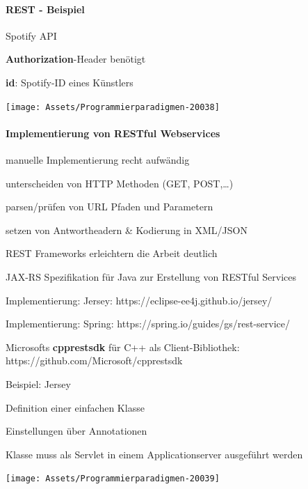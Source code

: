 \documentclass[10pt]{article}
\begin{document}
  \paragraph{REST - Beispiel}
  
  Spotify API
  \begin{itemize*}
    \item \textbf{Authorization}-Header benötigt
    \item \textbf{id}: Spotify-ID eines Künstlers
  \end{itemize*}
  \begin{center}
    \centering
    \texttt{[image: Assets/Programmierparadigmen-20038]}
  \end{center}
  
  \paragraph{Implementierung von RESTful Webservices}
  
  \begin{itemize*}
    \item manuelle Implementierung recht aufwändig
    \begin{itemize*}
      \item unterscheiden von HTTP Methoden (GET, POST,…)
      \item parsen/prüfen von URL Pfaden und Parametern
      \item setzen von Antwortheadern \& Kodierung in XML/JSON
    \end{itemize*}
    \item REST Frameworks erleichtern die Arbeit deutlich
    \begin{itemize*}
      \item JAX-RS Spezifikation für Java zur Erstellung von RESTful Services
      \begin{itemize*}
        \item Implementierung: Jersey: https://eclipse-ee4j.github.io/jersey/
        \item Implementierung: Spring:
        https://spring.io/guides/gs/rest-service/
      \end{itemize*}
      \item Microsofts \textbf{cpprestsdk} für C++ als Client-Bibliothek:
      https://github.com/Microsoft/cpprestsdk
    \end{itemize*}
  \end{itemize*}
  \begin{itemize*}
    \item Beispiel: Jersey
    \item Definition einer einfachen Klasse
    \begin{itemize*}
      \item Einstellungen über Annotationen
      \item Klasse muss als Servlet in einem Applicationserver ausgeführt werden
    \end{itemize*}
  \end{itemize*}
  \begin{center}
    \centering
    \texttt{[image: Assets/Programmierparadigmen-20039]}
  \end{center}
  
\end{document}
